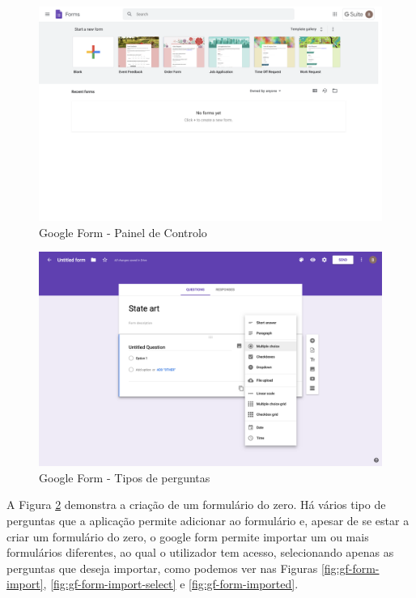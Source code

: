 \begin{figure}[ht!]
	\begin{center}
		\includegraphics[width=1\textwidth]{img/gf/gf-dashboard}
		\caption{Google Form - Painel de Controlo}
		\label{fig:gf-dashboard}
	\end{center}
\end{figure}


\begin{figure}[ht!]
	\begin{center}
		\includegraphics[width=1\textwidth]{img/gf/gf-form-q-type}
		\caption{Google Form - Tipos de perguntas}
		\label{fig:gf-form-q-type}
	\end{center}
\end{figure}

A Figura \ref{fig:gf-form-q-type} demonstra a criação de um formulário do zero. Há vários tipo de perguntas que a aplicação permite adicionar ao formulário e, apesar de se estar a criar um formulário do zero, o google form permite importar um ou mais formulários diferentes, ao qual o utilizador tem acesso, selecionando apenas as perguntas que deseja importar, como podemos ver nas Figuras \ref{fig:gf-form-import}, \ref{fig:gf-form-import-select} e \ref{fig:gf-form-imported}.

